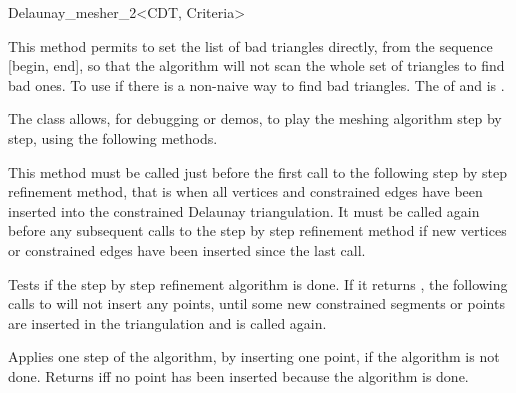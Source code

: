 \begin{ccRefClass}{Delaunay_mesher_2<CDT, Criteria>}
\begin{ccAdvanced}
                   { This method permits to set the list of bad triangles
                     directly, from the sequence [begin, end], so that the
                     algorithm will not scan the whole set of triangles to
                     find bad ones. To use if there is a non-naive way to
                     find bad triangles.  \ccRequire The 
                     of  and  is .}

\end{ccAdvanced}


\begin{ccAdvanced}

The \ccRefName{} class allows, for debugging or demos, to play the
meshing algorithm step by step, using the following methods.

         { This method must be called just before the first
             call to the following step by step refinement method,
             that is when all vertices and constrained edges have been
             inserted into the constrained Delaunay triangulation. It
             must be called again before any subsequent calls to the
             step by step refinement method if new vertices or constrained
             edges have been inserted since the last call.}

{ Tests if the step by step refinement algorithm is done. If it returns
  , the following calls to  will
  not insert any points, until some new constrained segments or points are
  inserted in the triangulation and  is called again. }

{ Applies one step of the algorithm, by inserting one point, if the
  algorithm is not done. Returns  iff no point has been inserted
  because the algorithm is done. }

\end{ccAdvanced}

\end{ccRefClass}

